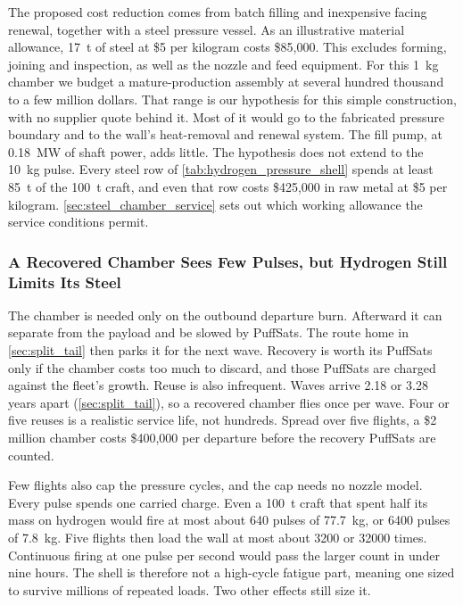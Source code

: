 \documentclass{article}
\begin{document}
The proposed cost reduction comes from batch filling and inexpensive facing renewal, together with a steel pressure vessel. As an illustrative material allowance, \SI{17}{\tonne} of steel at \$5 per kilogram costs \$85{,}000. This excludes forming, joining and inspection, as well as the nozzle and feed equipment. For this \SI{1}{\kilogram} chamber we budget a mature-production assembly at several hundred thousand to a few million dollars. That range is our hypothesis for this simple construction, with no supplier quote behind it. Most of it would go to the fabricated pressure boundary and to the wall's heat-removal and renewal system. The fill pump, at \SI{0.18}{\mega\watt} of shaft power, adds little. The hypothesis does not extend to the \SI{10}{\kilogram} pulse. Every steel row of \autoref{tab:hydrogen_pressure_shell} spends at least \SI{85}{\tonne} of the \SI{100}{\tonne} craft, and even that row costs \$425{,}000 in raw metal at \$5 per kilogram. \autoref{sec:steel_chamber_service} sets out which working allowance the service conditions permit.

\subsubsection{A Recovered Chamber Sees Few Pulses, but Hydrogen Still Limits Its Steel}\label{sec:steel_chamber_service}

The chamber is needed only on the outbound departure burn. Afterward it can separate from the payload and be slowed by PuffSats. The route home in \autoref{sec:split_tail} then parks it for the next wave. Recovery is worth its PuffSats only if the chamber costs too much to discard, and those PuffSats are charged against the fleet's growth. Reuse is also infrequent. Waves arrive 2.18 or 3.28 years apart (\autoref{sec:split_tail}), so a recovered chamber flies once per wave. Four or five reuses is a realistic service life, not hundreds. Spread over five flights, a \$2 million chamber costs \$400{,}000 per departure before the recovery PuffSats are counted.

Few flights also cap the pressure cycles, and the cap needs no nozzle model. Every pulse spends one carried charge. Even a \SI{100}{\tonne} craft that spent half its mass on hydrogen would fire at most about \num{640} pulses of \SI{77.7}{\kilogram}, or \num{6400} pulses of \SI{7.8}{\kilogram}. Five flights then load the wall at most about \num{3200} or \num{32000} times. Continuous firing at one pulse per second would pass the larger count in under nine hours. The shell is therefore not a high-cycle fatigue part, meaning one sized to survive millions of repeated loads. Two other effects still size it.
\end{document}
